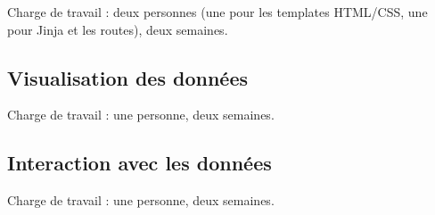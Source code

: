 \documentclass[12pt]{article}
\begin{document}
	Charge de travail : deux personnes (une pour les templates HTML/CSS, une pour Jinja et les routes), deux semaines.
	
	\subsection*{Visualisation des données}
	
	Charge de travail : une personne, deux semaines.
	
	\subsection*{Interaction avec les données}
	
	Charge de travail : une personne, deux semaines.
		
\end{document}
